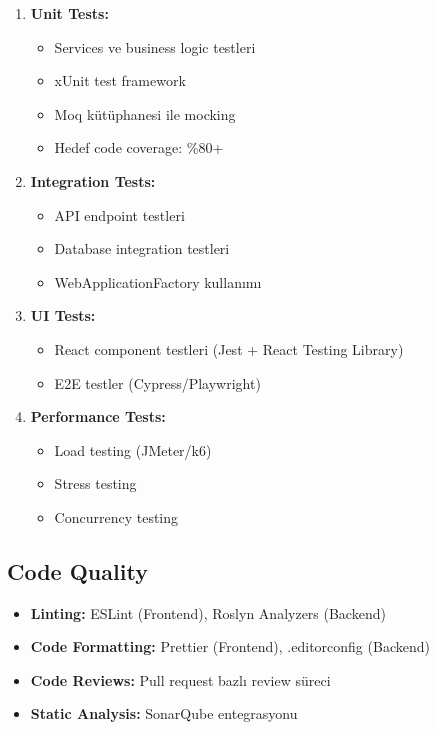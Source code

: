 \documentclass[12pt,a4paper]{article}
\begin{document}
\begin{enumerate}
    \item \textbf{Unit Tests:}
    \begin{itemize}
        \item Services ve business logic testleri
        \item xUnit test framework
        \item Moq kütüphanesi ile mocking
        \item Hedef code coverage: \%80+
    \end{itemize}
    
    \item \textbf{Integration Tests:}
    \begin{itemize}
        \item API endpoint testleri
        \item Database integration testleri
        \item WebApplicationFactory kullanımı
    \end{itemize}
    
    \item \textbf{UI Tests:}
    \begin{itemize}
        \item React component testleri (Jest + React Testing Library)
        \item E2E testler (Cypress/Playwright)
    \end{itemize}
    
    \item \textbf{Performance Tests:}
    \begin{itemize}
        \item Load testing (JMeter/k6)
        \item Stress testing
        \item Concurrency testing
    \end{itemize}
\end{enumerate}

\subsection{Code Quality}

\begin{itemize}
    \item \textbf{Linting:} ESLint (Frontend), Roslyn Analyzers (Backend)
    \item \textbf{Code Formatting:} Prettier (Frontend), .editorconfig (Backend)
    \item \textbf{Code Reviews:} Pull request bazlı review süreci
    \item \textbf{Static Analysis:} SonarQube entegrasyonu
\end{itemize}
\end{document}
